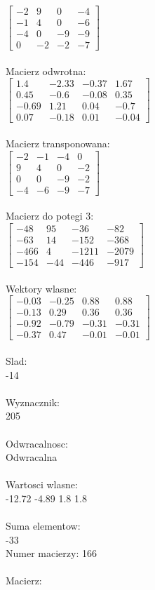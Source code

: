 \documentclass[a4paper,12pt]{article}
\begin{document}
$\begin{bmatrix} -2&9&0&-4\\-1&4&0&-6\\-4&0&-9&-9\\0&-2&-2&-7 \end{bmatrix}$
\\
\\
Macierz odwrotna:\\

$\begin{bmatrix} 1.4&-2.33&-0.37&1.67\\0.45&-0.6&-0.08&0.35\\-0.69&1.21&0.04&-0.7\\0.07&-0.18&0.01&-0.04 \end{bmatrix}$
\\
\\
Macierz transponowana:\\

$\begin{bmatrix} -2&-1&-4&0\\9&4&0&-2\\0&0&-9&-2\\-4&-6&-9&-7 \end{bmatrix}$
\\
\\
Macierz do potegi 3:\\

$\begin{bmatrix} -48&95&-36&-82\\-63&14&-152&-368\\-466&4&-1211&-2079\\-154&-44&-446&-917 \end{bmatrix}$
\\
\\
Wektory wlasne:\\

$\begin{bmatrix} -0.03&-0.25&0.88&0.88\\-0.13&0.29&0.36&0.36\\-0.92&-0.79&-0.31&-0.31\\-0.37&0.47&-0.01&-0.01 \end{bmatrix}$
\\
\\
Slad:\\
-14
\\
\\
Wyznacznik:\\
205
\\
\\
Odwracalnosc:\\
Odwracalna
\\
\\
Wartosci wlasne:\\
-12.72 -4.89 1.8 1.8
\\
\\
Suma elementow:\\
-33
\\
\newpage
Numer macierzy:
166
\\
\\
Macierz:\\
\end{document}
